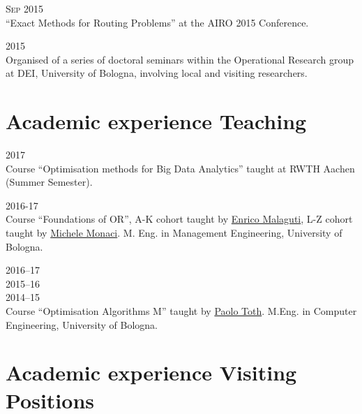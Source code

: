 \begin{paracol}{2}
  \textsc{Sep 2015}
\switchcolumn
  \\
  ``Exact Methods for Routing Problems'' at the AIRO 2015 Conference.
\end{paracol}

\begin{paracol}{2}
  \textsc{2015}
\switchcolumn
  \\
  Organised of a series of doctoral seminars within the Operational Research group at DEI, University of Bologna, involving local and visiting researchers.
\end{paracol}

\section*{Academic experience {\small Teaching}}

\begin{paracol}{2}
  \textsc{2017}
\switchcolumn
  \\
  Course ``Optimisation methods for Big Data Analytics'' taught at RWTH Aachen (Summer Semester).
\end{paracol}

\begin{paracol}{2}
  \textsc{2016-17}
\switchcolumn
  \\
  Course ``Foundations of OR'', A-K cohort taught by \href{https://scholar.google.com/citations?user=3nD4vYkAAAAJ}{Enrico Malaguti}, L-Z cohort taught by \href{https://scholar.google.com/citations?user=wORMYBMAAAAJ}{Michele Monaci}. M. Eng. in Management Engineering, University of Bologna.
\end{paracol}

\begin{paracol}{2}
  \textsc{2016--17\\2015--16\\2014--15}
\switchcolumn
  \\
  Course ``Optimisation Algorithms M'' taught by \href{https://scholar.google.com/citations?user=2IPL4XIAAAAJ}{Paolo Toth}. M.Eng. in Computer Engineering, University of Bologna.
\end{paracol}

\section*{Academic experience {\small Visiting Positions}}

